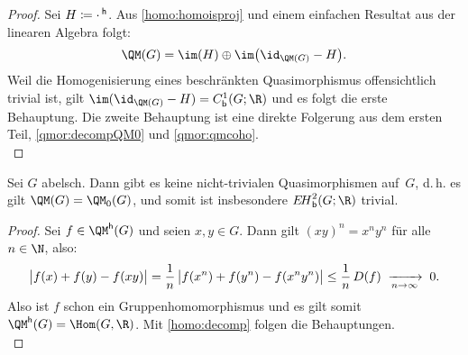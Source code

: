 \begin{proof}
    Sei $H\defeq {\cdot\,}\homo$. Aus \cref{homo:homoisproj} und einem einfachen
    Resultat aus der linearen Algebra folgt:
    \[ \QM(G) = \im(H) \oplus \im\bigl(\id_{\QM(G)}-H\bigr) . \]
    Weil die Homogenisierung eines beschränkten Quasimorphismus offensichtlich
    trivial ist, gilt $\im(\id_{\QM(G)}-H) = \Cb^1(G;\R)$ und es folgt die
    erste Behauptung.
    Die zweite Behauptung ist eine direkte Folgerung aus dem ersten Teil,
    \cref{qmor:decompQM0} und \cref{qmor:qmcoho}.
    \\
\end{proof}

\begin{thKorollar}
    Sei $G$ abelsch. Dann gibt es keine nicht-trivialen
    Quasimorphismen auf~$G$, d.\,h. es gilt $\QM(G) = \QM_0(G)$,
    und somit ist insbesondere $\EHb^2(G;\R)$ trivial.
\end{thKorollar}

\begin{proof}
    Sei $f\in\QM\homo(G)$ und seien $x,y\in G$. Dann gilt
    $(xy)^n = x^ny^n$ für alle $n\in\N$, also:
    \[  \abs[\big]{ f(x) + f(y) - f(xy) }
        = \frac{1}{n} \, \abs[\big]{ f(x^n) + f(y^n) - f(x^ny^n) }
        \leq \frac{1}{n} \, D(f)
        \;\xrightarrow[n\to\infty]{}\; 0
    . \]
    Also ist $f$ schon ein Gruppenhomomorphismus und es gilt somit
    $\QM\homo(G) = \Hom(G,\R)$. Mit \cref{homo:decomp} folgen
    die Behauptungen.
    \\
\end{proof}
